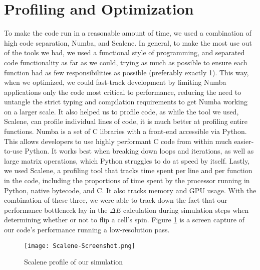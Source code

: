 \documentclass[%
 reprint,
 amsmath,amssymb,
 aps,
]{revtex4-2}
\begin{document}
\section{\label{sec:level1}Profiling and Optimization}
To make the code run in a reasonable amount of time, we used a combination of high code separation, Numba, and Scalene.
In general, to make the most use out of the tools we had, we used a functional style of programming, and separated code functionality as far as we could, trying as much as possible to ensure each function had as few responsibilities as possible (preferably exactly 1). This way, when we optimized, we could fast-track development by limiting Numba applications only the code most critical to performance, reducing the need to untangle the strict typing and compilation requirements to get Numba working on a larger scale. It also helped us to profile code, as while the tool we used, Scalene, can profile individual lines of code, it is much better at profiling entire functions.
Numba is a set of C libraries with a front-end accessible via Python. This allows developers to use highly performant C code from within much easier-to-use Python. It works best when breaking down loops and iterations, as well as large matrix operations, which Python struggles to do at speed by itself.
Lastly, we used Scalene, a profiling tool that tracks time spent per line and per function in the code, including the proportions of time spent by the processor running in Python, native bytecode, and C. It also tracks memory and GPU usage.
With the combination of these three, we were able to track down the fact that our performance bottleneck lay in the $\Delta E$ calculation during simulation steps when determining whether or not to flip a cell's spin. Figure \ref{fig:Scalene-Screenshot} is a screen capture of our code's performance running a low-resolution pass.

\begin{figure}
    \centering
    \texttt{[image: Scalene-Screenshot.png]}
    \caption{Scalene profile of our simulation}
    \label{fig:Scalene-Screenshot}
\end{figure}


 
\end{document}
